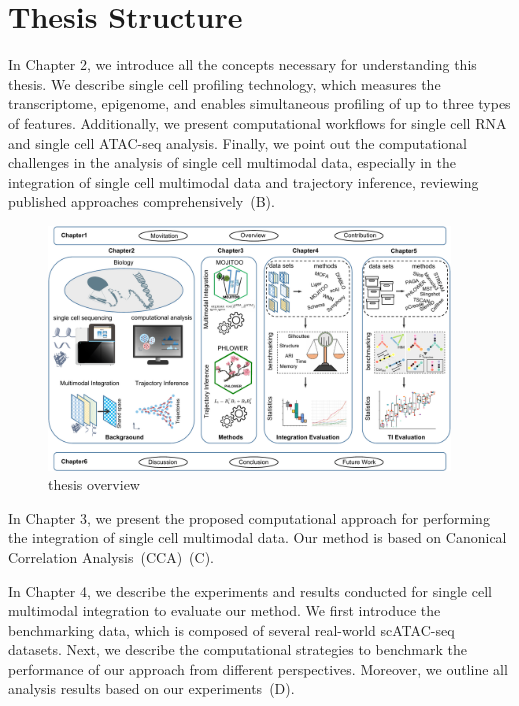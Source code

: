\section{Thesis Structure}
\label{introduction:sec3.structure}
In Chapter 2, we introduce all the concepts necessary for understanding this thesis. We describe single cell profiling technology, which measures the transcriptome, epigenome, and enables simultaneous profiling of up to three types of features. Additionally, we present computational workflows for single cell RNA and single cell ATAC-seq analysis. Finally, we point out the computational challenges in the analysis of single cell multimodal data, especially in the integration of single cell multimodal data and trajectory inference, reviewing published approaches comprehensively~(B).
\begin{figure}[!ht]
	\centering
	\includegraphics[width=0.95\textwidth]{thesis_overview/fig}
	\vspace{0.1cm}
	\caption[thesis overview]{thesis overview}
	\label{fig:thesis_overview}
\end{figure}
In Chapter 3, we present the proposed computational approach for performing the integration of single cell multimodal data. Our method is based on Canonical Correlation Analysis~(CCA)~(C).

In Chapter 4, we describe the experiments and results conducted for single cell multimodal integration to evaluate our method. We first introduce the benchmarking data, which is composed of several real-world scATAC-seq datasets. Next, we describe the computational strategies to benchmark the performance of our approach from different perspectives. Moreover, we outline all analysis results based on our experiments~(D).

